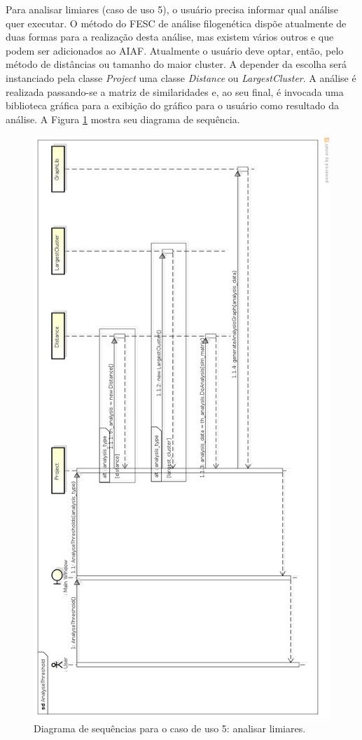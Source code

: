 Para analisar limiares (caso de uso 5),
o usuário precisa informar qual análise quer executar. O método do FESC de análise filogenética dispõe atualmente de duas formas
para a realização desta análise, mas existem vários outros e que podem ser adicionados ao AIAF. Atualmente o usuário deve optar, então, pelo método de
distâncias ou tamanho do maior cluster. A depender da escolha será instanciado pela classe \textit{Project} uma classe \textit{Distance} ou
\textit{LargestCluster}. A análise é realizada passando-se a matriz de similaridades e, ao seu final, é invocada uma biblioteca gráfica
para a exibição do gráfico para o usuário como resultado da análise. A Figura \ref{fig:analyse-threshold} mostra seu diagrama de sequência.

\begin{figure}
\centering
\includegraphics[scale=0.34]{analyse-threshold}
\caption{Diagrama de sequências para o caso de uso 5: analisar limiares.}
\label{fig:analyse-threshold}
\end{figure}

